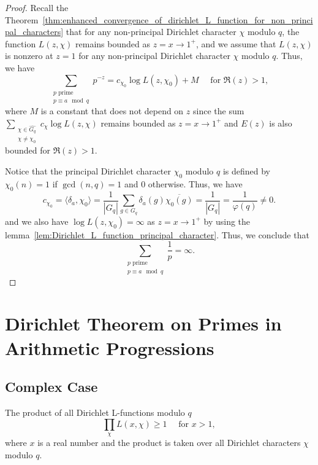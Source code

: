 \documentclass{elegantbook}
\begin{document}
\begin{proof}
  Recall the Theorem~\ref{thm:enhanced_convergence_of_dirichlet_L_function_for_non_principal_characters} that for any non-principal Dirichlet character $\chi$ modulo $q$, the function $L(z,\chi)$ remains bounded as $z=x \to 1^{+}$, and we assume that $L(z,\chi)$ is nonzero at $z=1$ for any non-principal Dirichlet character $\chi$ modulo $q$. Thus, we have
  \[
    \sum_{\substack{p \text{ prime} \\ p \equiv a \mod q}} p^{-z} = c_{\chi_0} \log L(z,\chi_0) + M \quad \text{ for } \Re(z) > 1,
  \]
  where $M$ is a constant that does not depend on $z$ since the sum $\sum_{\substack{\chi \in \widehat{G_q} \\ \chi \ne \chi_0}} c_{\chi} \log L(z,\chi)$ remains bounded as $z=x \to 1^{+}$ and $E(z)$ is also bounded for $\Re(z) > 1$.

  Notice that the principal Dirichlet character $\chi_0$ modulo $q$ is defined by $\chi_0(n) = 1$ if $\gcd(n,q) = 1$ and $0$ otherwise. Thus, we have
  \[
    c_{\chi_0} = \langle \delta_{a}, \chi_0 \rangle = \frac{1}{|G_q|} \sum_{g \in G_q} \delta_{a}(g) \overline{\chi_0(g)} = \frac{1}{|G_q|} = \frac{1}{\varphi(q)}\ne 0.
  \]
  and we also have \( \log L(z,\chi_0) = \infty \) as \(z=x \to 1^{+}\)  by using the lemma~\ref{lem:Dirichlet_L_function_principal_character}.
  Thus, we conclude that
  \[
    \sum_{\substack{p \text{ prime} \\ p \equiv a \mod q}} \frac{1}{p} = \infty.
  \]
\end{proof}


\chapter{Dirichlet Theorem on Primes in Arithmetic Progressions}

\section{Complex Case}

\begin{lemma} \label{lem:Dirichlet_Euler_product_idea}
  The product of all Dirichlet L-functions modulo \(q\)
  \[
    \prod_{\chi} L(x,\chi) \geq 1 \quad \text{ for } x > 1,
  \]
  where $x$ is a real number and the product is taken over all Dirichlet characters \(\chi\) modulo \(q\).
\end{lemma}
\end{document}
